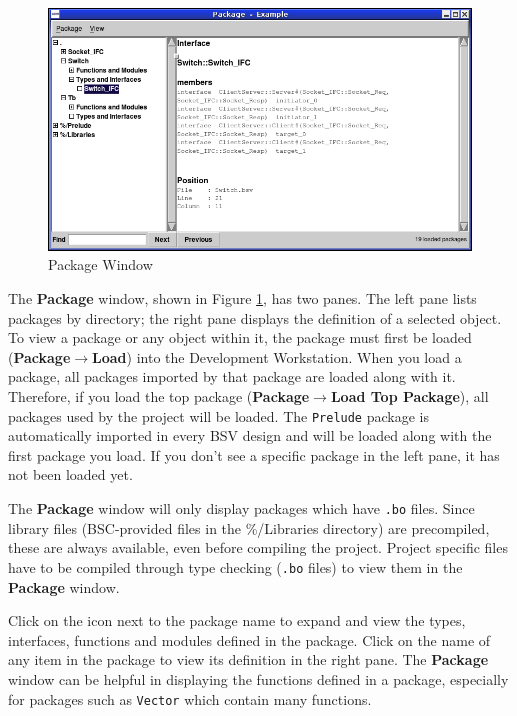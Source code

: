 \documentclass{article}
\newcommand{\te}[1]{\texttt{#1}}
\begin{document}
\begin{figure}[ht]
\begin{center}
\includegraphics[width = 5 in]{figures/package}
\caption{Package Window}
\label{fig-package}
\end{center}
\end{figure}


The {\bf Package} window, shown in Figure \ref{fig-package},  has two panes.  The left pane lists  packages
 by directory; the right pane displays the definition of  a selected object.
To view a package or any object within it, the package
must first be loaded ({\bf Package$\rightarrow$Load}) into the Development Workstation.  When you load a package, all packages imported by that
package are loaded along with it.  Therefore, if you load the
  top package  ({\bf Package$\rightarrow$Load Top
 Package}),  all packages used by the project will be loaded.
The  \te{Prelude} package is automatically imported in every BSV design and  will
 be loaded along with the first package you load.    If you don't see a specific
package in the left pane, it has not been loaded yet.

The {\bf Package} window will only display packages which have
\te{.bo} files.
Since library files (BSC-provided files in the
\%/Libraries directory) are precompiled, these are always
available, even before compiling the project.  Project specific files have to  be compiled through
type checking (\te{.bo} files) to view them in the {\bf Package} window.



Click on the icon next to
the package name to expand and view the
types, interfaces, functions and modules defined in the package.
Click on the name of  any item  in the   package
to view its definition in the right pane.  The {\bf Package} window can be helpful in displaying the
functions defined in a package, especially for packages such as
\te{Vector} which contain many functions.
\end{document}
